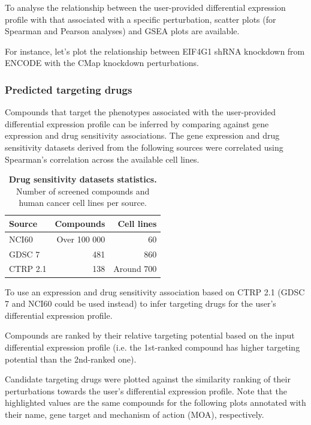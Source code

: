 To analyse the relationship between the user-provided differential expression profile with that associated with a specific perturbation, scatter plots (for Spearman and Pearson analyses) and GSEA plots are available.

For instance, let’s plot the relationship between EIF4G1 shRNA knockdown from ENCODE with the CMap knockdown perturbations.

\subsubsection{Predicted targeting drugs}

Compounds that target the phenotypes associated with the user-provided differential expression profile can be inferred by comparing against gene expression and drug sensitivity associations. The gene expression and drug sensitivity datasets derived from the following sources were correlated using Spearman’s correlation across the available cell lines.

\begin{table}[!ht]
\centering
\parnotereset
\small
\caption[Drug sensitivity datasets statistics]{\textbf{Drug sensitivity datasets statistics.} Number of screened compounds and human cancer cell lines per source.}
\label{tab:drug-sensitivity-datasets}
\begin{tabularx}{.47\textwidth}{ l r r }
\toprule
\textbf{Source}   & \textbf{Compounds} & \textbf{Cell lines} \\
\midrule
NCI60             &                   Over 100 000 & 60 \\
GDSC 7            &                            481 & 860 \\
CTRP 2.1          &                            138 & Around 700 \\
\bottomrule
\end{tabularx}
\parnotes
\end{table}

To use an expression and drug sensitivity association based on CTRP 2.1 (GDSC 7 and NCI60 could be used instead) to infer targeting drugs for the user’s differential expression profile.

Compounds are ranked by their relative targeting potential based on the input differential expression profile (i.e. the 1st-ranked compound has higher targeting potential than the 2nd-ranked one).

Candidate targeting drugs were plotted against the similarity ranking of their perturbations towards the user’s differential expression profile. Note that the highlighted values are the same compounds for the following plots annotated with their name, gene target and mechanism of action (MOA), respectively.

